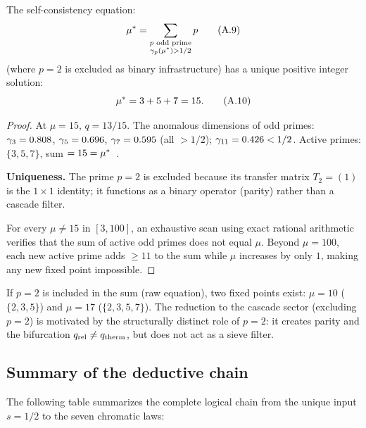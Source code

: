 \documentclass[12pt,a4paper]{article}
\providecommand{\qrel}{\ensuremath{q_{\mathrm{rel}}}}
\begin{document}
\begin{theorembox}
The self-consistency equation:
\begin{equation}
  {\mu^{*}} = \sum_{\substack{p \text{ odd prime} \\
  \gamma_{p}({\mu^{*}}) > 1/2}} p
  \tag{A.9}
\end{equation}
(where $p = 2$ is excluded as binary infrastructure) has a unique
positive integer solution:
\begin{equation}
  {\mu^{*}} = 3 + 5 + 7 = 15.
  \tag{A.10}
\end{equation}

\begin{proof}
At $\mu = 15$, $q = 13/15$. The anomalous dimensions of odd primes:
$\gamma_{3} = 0.808$, $\gamma_{5} = 0.696$, $\gamma_{7} = 0.595$ (all
$> 1/2$); $\gamma_{11} = 0.426 < 1/2$. Active primes: $\{3,5,7\}$,
sum $= 15 = {\mu^{*}}$~\checkmark.

\textbf{Uniqueness.}
The prime $p = 2$ is excluded because its transfer matrix
$T_2 = (1)$ is the $1 \times 1$ identity; it functions as a binary
operator (parity) rather than a cascade filter.

For every $\mu \neq 15$ in $[3, 100]$, an exhaustive scan using exact
rational arithmetic verifies that the sum of active odd primes does not
equal $\mu$. Beyond $\mu = 100$, each new active prime adds $\geq 11$
to the sum while $\mu$ increases by only $1$, making any new fixed
point impossible.
\end{proof}
\end{theorembox}

\begin{remark}
If $p = 2$ is included in the sum (raw equation), two fixed points
exist: $\mu = 10$ ($\{2,3,5\}$) and $\mu = 17$ ($\{2,3,5,7\}$).
The reduction to the cascade sector (excluding $p = 2$) is motivated
by the structurally distinct role of $p = 2$: it creates parity and
the bifurcation $\qrel \neq \qtherm$, but does not act as a sieve
filter.
\end{remark}

\subsection{Summary of the deductive chain}
\label{app:summary}

The following table summarizes the complete logical chain from the
unique input $s = 1/2$ to the seven chromatic laws:
\end{document}
